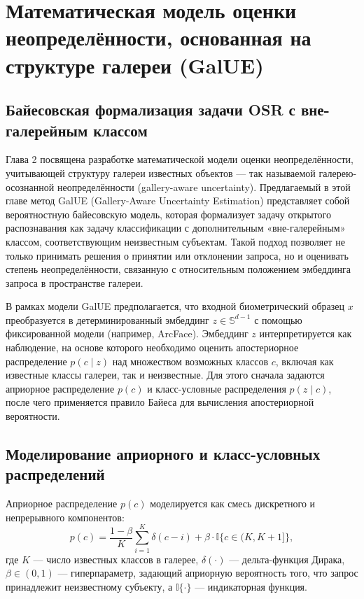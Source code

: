 \chapter{Математическая модель оценки неопределённости, основанная на структуре галереи (GalUE)}\label{ch:galue}
\section{Байесовская формализация задачи OSR с вне-галерейным классом}\label{sec:galue/bayesian_formulation}
Глава 2 посвящена разработке математической модели оценки неопределённости, учитывающей структуру галереи известных объектов — так называемой галерею-осознанной неопределённости (gallery-aware uncertainty).  
Предлагаемый в этой главе метод GalUE (Gallery-Aware Uncertainty Estimation) представляет собой вероятностную байесовскую модель, которая формализует задачу открытого распознавания как задачу классификации с дополнительным «вне-галерейным» классом, соответствующим неизвестным субъектам.  
Такой подход позволяет не только принимать решения о принятии или отклонении запроса, но и оценивать степень неопределённости, связанную с относительным положением эмбеддинга запроса в пространстве галереи.  

В рамках модели GalUE предполагается, что входной биометрический образец \(x\) преобразуется в детерминированный эмбеддинг \(z \in \mathbb{S}^{d-1}\) с помощью фиксированной модели (например, ArcFace).  
Эмбеддинг \(z\) интерпретируется как наблюдение, на основе которого необходимо оценить апостериорное распределение \(p(c \mid z)\) над множеством возможных классов \(c\), включая как известные классы галереи, так и неизвестные.  
Для этого сначала задаются априорное распределение \(p(c)\) и класс-условные распределения \(p(z \mid c)\), после чего применяется правило Байеса для вычисления апостериорной вероятности.  
\section{Моделирование априорного и класс-условных распределений}\label{sec:galue/prior_and_likelihood}
Априорное распределение \(p(c)\) моделируется как смесь дискретного и непрерывного компонентов:  
\[
p(c) = \frac{1 - \beta}{K} \sum_{i=1}^{K} \delta(c - i) + \beta \cdot \mathbb{I}\{c \in (K, K+1]\},
\]  
где \(K\) — число известных классов в галерее, \(\delta(\cdot)\) — дельта-функция Дирака, \(\beta \in (0,1)\) — гиперпараметр, задающий априорную вероятность того, что запрос принадлежит неизвестному субъекту, а \(\mathbb{I}\{\cdot\}\) — индикаторная функция.  

